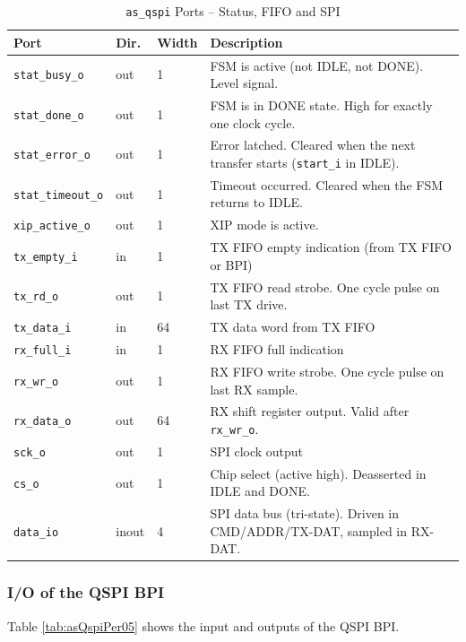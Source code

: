 \begin{table}[H]
\caption{\texttt{as\_qspi} Ports -- Status, FIFO and SPI}
\label{tab:asQspiPer04ab}
\centering
\begin{tabularx}{\textwidth}{|l|l|l|X|}
  \hline
  Port & Dir. & Width & Description \\
  \hline\hline
  \texttt{stat\_busy\_o}    & out & 1  & FSM is active (not IDLE, not DONE). Level signal. \\
  \hline
  \texttt{stat\_done\_o}    & out & 1  & FSM is in DONE state. High for exactly one clock cycle. \\
  \hline
  \texttt{stat\_error\_o}   & out & 1  & Error latched. Cleared when the next transfer starts (\texttt{start\_i} in IDLE). \\
  \hline
  \texttt{stat\_timeout\_o} & out & 1  & Timeout occurred. Cleared when the FSM returns to IDLE. \\
  \hline
  \texttt{xip\_active\_o}   & out & 1  & XIP mode is active. \\
  \hline
  \texttt{tx\_empty\_i}     & in  & 1  & TX FIFO empty indication (from TX FIFO or BPI) \\
  \hline
  \texttt{tx\_rd\_o}        & out & 1  & TX FIFO read strobe. One cycle pulse on last TX drive. \\
  \hline
  \texttt{tx\_data\_i}      & in  & 64 & TX data word from TX FIFO \\
  \hline
  \texttt{rx\_full\_i}      & in  & 1  & RX FIFO full indication \\
  \hline
  \texttt{rx\_wr\_o}        & out & 1  & RX FIFO write strobe. One cycle pulse on last RX sample. \\
  \hline
  \texttt{rx\_data\_o}      & out & 64 & RX shift register output. Valid after \texttt{rx\_wr\_o}. \\
  \hline
  \texttt{sck\_o}           & out & 1  & SPI clock output \\
  \hline
  \texttt{cs\_o}            & out & 1  & Chip select (active high). Deasserted in IDLE and DONE. \\
  \hline
  \texttt{data\_io}         & inout & 4 & SPI data bus (tri-state). Driven in CMD/ADDR/TX-DAT, sampled in RX-DAT. \\
  \hline
\end{tabularx}
\end{table}

\subsubsection{I/O of the QSPI BPI}
Table \ref{tab:asQspiPer05} shows the input and outputs of the QSPI BPI.

